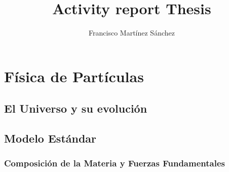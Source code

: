 \documentclass[11pt,english]{report}
\begin{document}
\title{Activity report Thesis}
\author{Francisco Martínez Sánchez}
\maketitle


\tableofcontents
\clearpage
\listoftables
\clearpage
\listoffigures
\clearpage

\begin{abstract}
\end{abstract}









\chapter{Física de Partículas}


	\section{El Universo y su evolución} 
	
	
	\section{Modelo Estándar} 	
	
	
		\subsection{Composición de la Materia y Fuerzas Fundamentales} 
		
		
\end{document}
